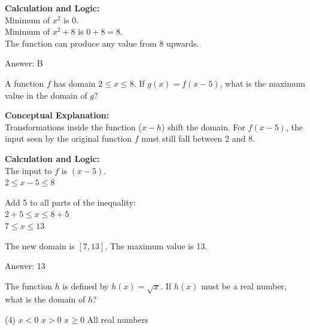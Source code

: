 \documentclass[11pt,paper=a4,answers]{exam}
\begin{document}
\begin{questions}
\begin{solution}
\vspace{30pt}

\textbf{Calculation and Logic:} \\
Minimum of $x^2$ is 0. \\
Minimum of $x^2 + 8$ is $0 + 8 = 8$. \\
The function can produce any value from 8 upwards.

\vspace{30pt}

Answer: \colorbox{yellow!100}{B}
\end{solution}

\vspace{40pt}

\question
A function $f$ has domain $2 \leq x \leq 8$. If $g(x) = f(x - 5)$, what is the maximum value in the domain of $g$?

\begin{solution}
\textbf{Conceptual Explanation:} \\
Transformations inside the function ($x - h$) shift the domain. For $f(x-5)$, the input seen by the original function $f$ must still fall between 2 and 8.

\vspace{30pt}

\textbf{Calculation and Logic:} \\
The input to $f$ is $(x - 5)$. \\
$2 \leq x - 5 \leq 8$

\vspace{15pt}

Add 5 to all parts of the inequality: \\
$2 + 5 \leq x \leq 8 + 5$ \\
$7 \leq x \leq 13$

\vspace{15pt}

The new domain is $[7, 13]$. The maximum value is 13.

\vspace{30pt}

Answer: \colorbox{yellow!100}{13}
\end{solution}

\vspace{40pt}

\question
The function $h$ is defined by $h(x) = \sqrt{x}$. If $h(x)$ must be a real number, what is the domain of $h$?
\begin{tasks}(4)
    \task $x < 0$
    \task $x > 0$
    \task $x \geq 0$
    \task All real numbers
\end{tasks}


\end{questions}
\end{document}
